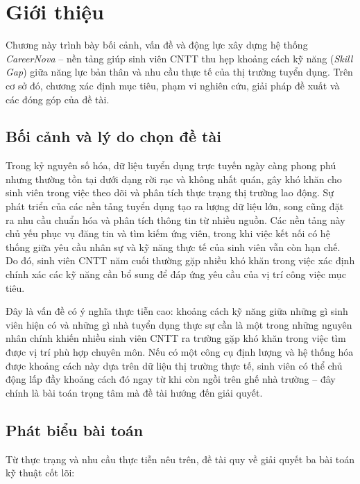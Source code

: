 \chapter{Giới thiệu}
\label{Chapter1}

Chương này trình bày bối cảnh, vấn đề và động lực xây dựng hệ thống \textit{CareerNova} -- nền tảng giúp sinh viên CNTT thu hẹp khoảng cách kỹ năng (\textit{Skill Gap}) giữa năng lực bản thân và nhu cầu thực tế của thị trường tuyển dụng. Trên cơ sở đó, chương xác định mục tiêu, phạm vi nghiên cứu, giải pháp đề xuất và các đóng góp của đề tài.

\section{Bối cảnh và lý do chọn đề tài}

Trong kỷ nguyên số hóa, dữ liệu tuyển dụng trực tuyến ngày càng phong phú nhưng thường tồn tại dưới dạng rời rạc và không nhất quán, gây khó khăn cho sinh viên trong việc theo dõi và phân tích thực trạng thị trường lao động. Sự phát triển của các nền tảng tuyển dụng tạo ra lượng dữ liệu lớn, song cũng đặt ra nhu cầu chuẩn hóa và phân tích thông tin từ nhiều nguồn. Các nền tảng này chủ yếu phục vụ đăng tin và tìm kiếm ứng viên, trong khi việc kết nối có hệ thống giữa yêu cầu nhân sự và kỹ năng thực tế của sinh viên vẫn còn hạn chế. Do đó, sinh viên CNTT năm cuối thường gặp nhiều khó khăn trong việc xác định chính xác các kỹ năng cần bổ sung để đáp ứng yêu cầu của vị trí công việc mục tiêu.

Đây là vấn đề có ý nghĩa thực tiễn cao: khoảng cách kỹ năng giữa những gì sinh viên hiện có và những gì nhà tuyển dụng thực sự cần là một trong những nguyên nhân chính khiến nhiều sinh viên CNTT ra trường gặp khó khăn trong việc tìm được vị trí phù hợp chuyên môn. Nếu có một công cụ định lượng và hệ thống hóa được khoảng cách này dựa trên dữ liệu thị trường thực tế, sinh viên có thể chủ động lấp đầy khoảng cách đó ngay từ khi còn ngồi trên ghế nhà trường -- đây chính là bài toán trọng tâm mà đề tài hướng đến giải quyết.

\section{Phát biểu bài toán}

Từ thực trạng và nhu cầu thực tiễn nêu trên, đề tài quy về giải quyết ba bài toán kỹ thuật cốt lõi:

